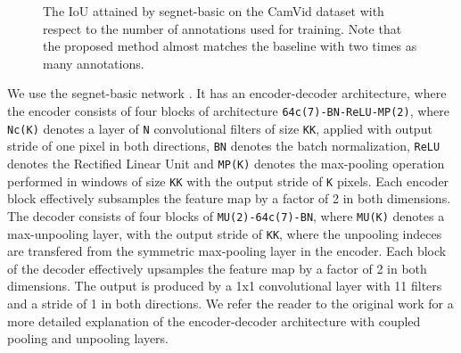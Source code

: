 \documentclass[a4paper]{article}
\begin{document}
\begin{figure}
\centering
{}
\caption{The IoU attained by segnet-basic on the CamVid dataset with respect to the number of annotations used for training. Note that the proposed method almost matches the baseline with two times as many annotations. \label{iouplot1}}
\end{figure}
We use the segnet-basic network \cite{segnet}. It has an encoder-decoder architecture, where the encoder consists of four blocks of architecture \texttt{64c(7)-BN-ReLU-MP(2)}, where \texttt{Nc(K)} denotes a layer of \texttt{N} convolutional filters of size \texttt{K}\texttimes\texttt{K}, applied with output stride of one pixel in both directions, \texttt{BN} denotes the batch normalization, \texttt{ReLU} denotes the Rectified Linear Unit and \texttt{MP(K)} denotes the max-pooling operation performed in windows of size \texttt{K}\texttimes\texttt{K} with the output stride of \texttt{K} pixels. Each encoder block effectively subsamples the feature map by a factor of 2 in both dimensions. The decoder consists of four blocks of \texttt{MU(2)-64c(7)-BN}, where \texttt{MU(K)} denotes a max-unpooling layer, with the output stride of \texttt{K}\texttimes\texttt{K}, where the unpooling indeces are transfered from the symmetric max-pooling layer in the encoder. Each block of the decoder effectively upsamples the feature map by a factor of 2 in both dimensions. The output is produced by a 1x1 convolutional layer with 11 filters and a stride of 1 in both directions. We refer the reader to the original work \cite{segnet} for a more detailed explanation of the encoder-decoder architecture with coupled pooling and unpooling layers.
\end{document}
